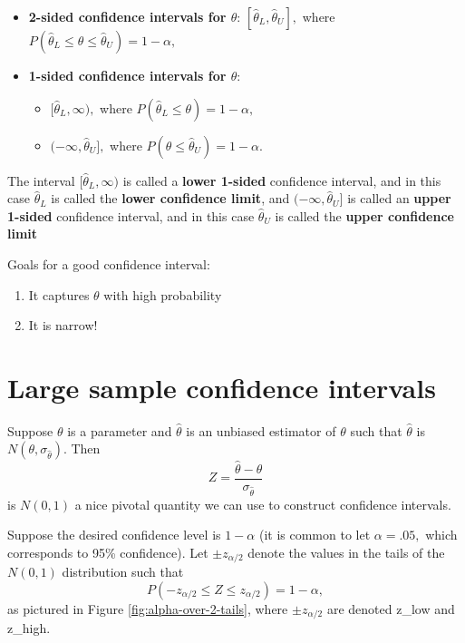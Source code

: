 \documentclass[
]{book}
\providecommand{\tightlist}{%
  \setlength{\itemsep}{0pt}\setlength{\parskip}{0pt}}
\theoremstyle{definition}
\theoremstyle{definition}
\theoremstyle{definition}
\theoremstyle{definition}
\theoremstyle{remark}
\begin{document}
\begin{itemize}
\tightlist
\item
  \textbf{2-sided confidence intervals for \(\theta\)}: \([\hat{\theta}_L,\hat{\theta}_U],\) where \(P(\hat{\theta}_L \leq \theta \leq \hat{\theta}_U)=1-\alpha,\)
\item
  \textbf{1-sided confidence intervals for \(\theta\)}:

  \begin{itemize}
  \tightlist
  \item
    \([\hat{\theta}_L,\infty),\) where \(P(\hat{\theta}_L \leq \theta)=1-\alpha,\)
  \item
    \((-\infty,\hat{\theta}_U],\) where \(P(\theta \leq \hat{\theta}_U)=1-\alpha\).
  \end{itemize}
\end{itemize}

The interval \([\hat{\theta}_L,\infty)\) is called a \textbf{lower 1-sided} confidence interval, and in this case \(\hat{\theta}_L\) is called the \textbf{lower confidence limit}, and \((-\infty,\hat{\theta}_U]\) is called an \textbf{upper 1-sided} confidence interval, and in this case \(\hat{\theta}_U\) is called the \textbf{upper confidence limit}

Goals for a good confidence interval:

\begin{enumerate}
\def\labelenumi{\arabic{enumi}.}
\tightlist
\item
  It captures \(\theta\) with high probability
\item
  It is narrow!
\end{enumerate}

\section{Large sample confidence intervals}\label{large-sample-confidence-intervals}

Suppose \(\theta\) is a parameter and \(\hat{\theta}\) is an unbiased estimator of \(\theta\) such that \(\hat{\theta}\) is \(N(\theta,\sigma_{\hat{\theta}})\). Then \[Z = \frac{\hat{\theta}-\theta}{\sigma_{\hat{\theta}}}\] is \(N(0,1)\) a nice pivotal quantity we can use to construct confidence intervals.

Suppose the desired confidence level is \(1 - \alpha\) (it is common to let \(\alpha = .05,\) which corresponds to 95\% confidence).
Let \(\pm z_{\alpha/2}\) denote the values in the tails of the \(N(0,1)\) distribution such that \[P\left(-z_{\alpha/2} \leq Z \leq z_{\alpha/2}\right) = 1-\alpha,\] as pictured in Figure \ref{fig:alpha-over-2-tails}, where \(\pm z_{\alpha/2}\) are denoted z\_low and z\_high.
\end{document}
